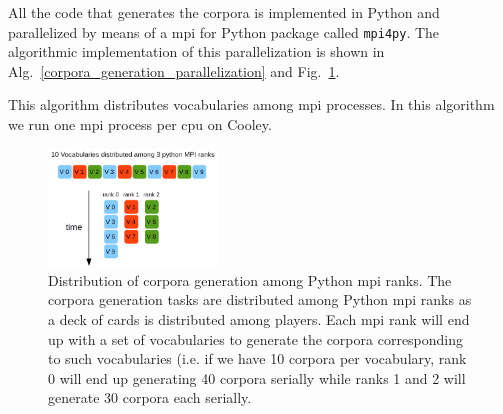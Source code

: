\documentclass[10pt,journal,compsoc]{IEEEtran}
\begin{document}
All the code that generates the corpora is implemented in Python and parallelized by means of a \gls{mpi} for Python package called \texttt{mpi4py}. The algorithmic implementation of this parallelization is shown in Alg.~\ref{corpora_generation_parallelization} and Fig.~\ref{fig:CorporaGenerationParallelization}.

\begin{algorithm}
	\caption{This algorithm distributes vocabularies among \gls{mpi} processes. In this algorithm we run one \gls{mpi} process per \gls{cpu} on Cooley.}
\label{corpora_generation_parallelization}
\begin{algorithmic}[1]
			\ENDFOR
		\ENDIF
	\ENDFOR
\end{algorithmic}
\end{algorithm}

\begin{figure}[h!]
    \centering
    \includegraphics[width=0.4\textwidth]{CorporaGenerationParallelization.png}
    \caption{Distribution of corpora generation among Python \gls{mpi} ranks. The corpora generation tasks are distributed among Python \gls{mpi} ranks as a deck of cards is distributed among players. Each \gls{mpi} rank will end up with a set of vocabularies to generate the corpora corresponding to such vocabularies (i.e. if we have 10 corpora per vocabulary, rank 0 will end up generating 40 corpora serially while ranks 1 and 2 will generate 30 corpora each serially.}
    \label{fig:CorporaGenerationParallelization}
\end{figure}
\end{document}
